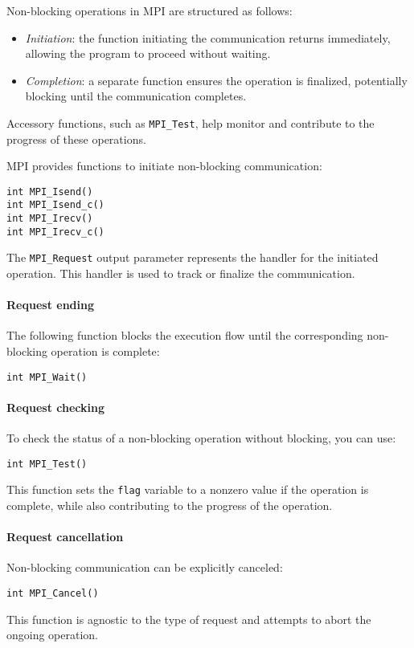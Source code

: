 Non-blocking operations in MPI are structured as follows:
\begin{itemize}
    \item \textit{Initiation}: the function initiating the communication returns immediately, allowing the program to proceed without waiting.
    \item \textit{Completion}: a separate function ensures the operation is finalized, potentially blocking until the communication completes.
\end{itemize}
Accessory functions, such as \texttt{MPI\_Test}, help monitor and contribute to the progress of these operations.

MPI provides functions to initiate non-blocking communication:
\begin{lstlisting}[style=C]
int MPI_Isend()
int MPI_Isend_c()
int MPI_Irecv()
int MPI_Irecv_c()
\end{lstlisting}
The \texttt{MPI\_Request} output parameter represents the handler for the initiated operation. 
This handler is used to track or finalize the communication.

\paragraph*{Request ending}
The following function blocks the execution flow until the corresponding non-blocking operation is complete:
\begin{lstlisting}[style=C]
int MPI_Wait()
\end{lstlisting}

\paragraph*{Request checking}
To check the status of a non-blocking operation without blocking, you can use:
\begin{lstlisting}[style=C]
int MPI_Test()
\end{lstlisting}
This function sets the \texttt{flag} variable to a nonzero value if the operation is complete, while also contributing to the progress of the operation.

\paragraph*{Request cancellation}
Non-blocking communication can be explicitly canceled:
\begin{lstlisting}[style=C]
int MPI_Cancel()
\end{lstlisting}
This function is agnostic to the type of request and attempts to abort the ongoing operation.

